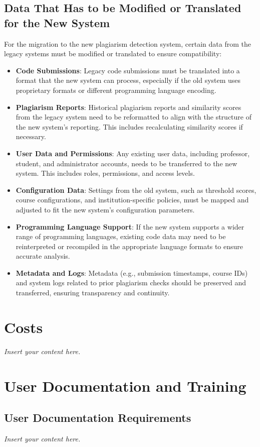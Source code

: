 \documentclass[12pt]{article}
\newcommand{\lips}{\textit{Insert your content here.}}
\begin{document}
\subsection{Data That Has to be Modified or Translated for the New System}
For the migration to the new plagiarism detection system, certain data from the legacy systems must be modified or translated to ensure compatibility:
\begin{itemize}
    \item \textbf{Code Submissions}: Legacy code submissions must be translated into a format that the new system can process, especially if the old system uses proprietary formats or different programming language encoding.
    \item \textbf{Plagiarism Reports}: Historical plagiarism reports and similarity scores from the legacy system need to be reformatted to align with the structure of the new system's reporting. This includes recalculating similarity scores if necessary.
    \item \textbf{User Data and Permissions}: Any existing user data, including professor, student, and administrator accounts, needs to be transferred to the new system. This includes roles, permissions, and access levels.
    \item \textbf{Configuration Data}: Settings from the old system, such as threshold scores, course configurations, and institution-specific policies, must be mapped and adjusted to fit the new system’s configuration parameters.
    \item \textbf{Programming Language Support}: If the new system supports a wider range of programming languages, existing code data may need to be reinterpreted or recompiled in the appropriate language formats to ensure accurate analysis.
    \item \textbf{Metadata and Logs}: Metadata (e.g., submission timestamps, course IDs) and system logs related to prior plagiarism checks should be preserved and transferred, ensuring transparency and continuity.
\end{itemize}

\section{Costs}
\lips
\section{User Documentation and Training}
\subsection{User Documentation Requirements}
\lips
\end{document}
